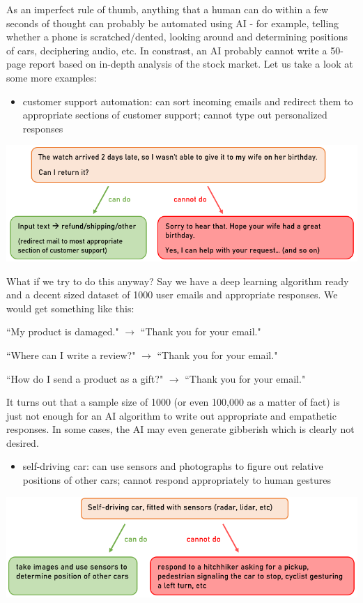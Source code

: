 \documentclass{article}[a4paper,12pt]
\theoremstyle{definition}
\begin{document}
As an imperfect rule of thumb, anything that a human can do within a few seconds of thought can probably be automated using AI - for example, telling whether a phone is scratched/dented, looking around and determining positions of cars, deciphering audio, etc. In constrast, an AI probably cannot write a 50-page report based on in-depth analysis of the stock market. Let us take a look at some more examples:
\begin{itemize}
	\item customer support automation: can sort incoming emails and redirect them to appropriate sections of customer support; cannot type out personalized responses
\end{itemize}
\begin{center}\includegraphics[width=\textwidth]{customer_support_automation.png}\end{center}
What if we try to do this anyway? Say we have a deep learning algorithm ready and a decent sized dataset of 1000 user emails and appropriate responses. We would get something like this:
\begin{center}
``My product is damaged." $\rightarrow$ ``Thank you for your email."

``Where can I write a review?" $\rightarrow$ ``Thank you for your email."

``How do I send a product as a gift?" $\rightarrow$ ``Thank you for your email."
\end{center}
It turns out that a sample size of 1000 (or even 100,000 as a matter of fact) is just not enough for an AI algorithm to write out appropriate and empathetic responses. In some cases, the AI may even generate gibberish which is clearly not desired.
\begin{itemize}
	\item self-driving car: can use sensors and photographs to figure out relative positions of other cars; cannot respond appropriately to human gestures
\end{itemize}
\begin{center}\includegraphics[width=\textwidth]{self_driving_car.png}\end{center}
\end{document}
